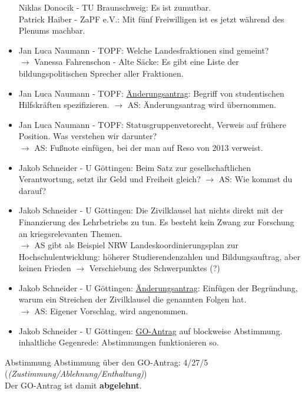 \begin{itemize}
        Niklas Donocik - TU Braunschweig:  Es ist zumutbar. \\
        Patrick Haiber - ZaPF e.V.:  Mit fünf Freiwilligen ist es jetzt während des Plenums machbar.
      \item Jan Luca Naumann - TOPF:  Welche Landesfraktionen sind gemeint? \\
        $\rightarrow$ Vanessa Fahrenschon - Alte Säcke:  Es gibt eine Liste der bildungspolitischen Sprecher aller Fraktionen.
      \item Jan Luca Naumann - TOPF:  \underline{Änderungsantrag}: Begriff von studentischen Hilfskräften spezifizieren.
        $\rightarrow$ AS: Änderungsantrag wird übernommen.
      \item Jan Luca Naumann - TOPF:  Statusgruppenvetorecht, Verweis auf frühere Position. Was verstehen wir darunter? \\
        $\rightarrow$ AS: Fußnote einfügen, bei der man auf Reso von 2013 verweist.
      \item Jakob Schneider - U Göttingen:  Beim Satz zur gesellschaftlichen Verantwortung, setzt ihr Geld und Freiheit gleich?
        $\rightarrow$ AS: Wie kommst du darauf?
      \item Jakob Schneider - U Göttingen:  Die Zivilklausel hat nichts direkt mit der Finanzierung des Lehrbetriebs zu tun. Es besteht kein Zwang zur Forschung an kriegsrelevanten Themen. \\
        $\rightarrow$ AS gibt als Beispiel NRW Landeskoordinierungsplan zur Hochschulentwicklung: höherer Studierendenzahlen und Bildungsauftrag, aber keinen Frieden $\rightarrow$ Verschiebung des Schwerpunktes (?)
      \item Jakob Schneider - U Göttingen:  \underline{Änderungsantrag}: Einfügen der Begründung, warum ein Streichen der Zivilklausel die genannten Folgen hat. \\
        $\rightarrow$ AS: Eigener Vorschlag, wird angenommen.
      \item Jakob Schneider - U Göttingen:  \underline{GO-Antrag} auf blockweise Abstimmung. \\
        inhaltliche Gegenrede: Abstimmungen funktionieren so.
    \end{itemize}

    \begin{danger}{Abstimmung}
      Abstimmung über den GO-Antrag: 4/27/5 (\textit{(Zustimmung/Ablehnung/Enthaltung)}) \\
      Der GO-Antrag ist damit \textbf{abgelehnt}.
    \end{danger}

